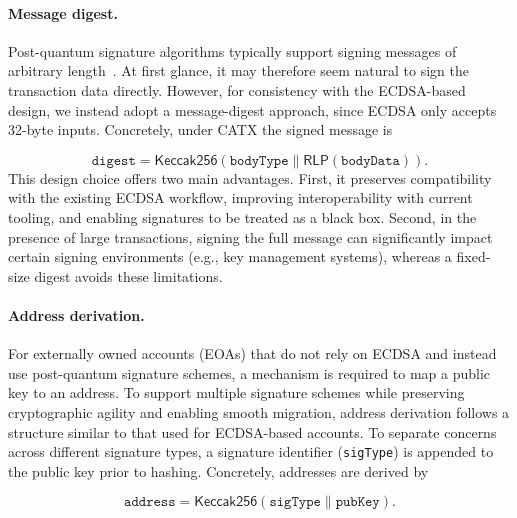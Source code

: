 \paragraph{Message digest.}\label{para:message-digest} Post-quantum signature algorithms typically support signing messages of arbitrary length~\cite{NIST:24MLDSA}.
At first glance, it may therefore seem natural to sign the transaction data directly.
However, for consistency with the ECDSA-based design, we instead adopt a message-digest approach, since ECDSA only accepts 32-byte inputs.
Concretely, under CATX the signed message is

\begin{equation*}
\texttt{digest} = \mathsf{Keccak256}\left(\texttt{bodyType} \parallel \mathsf{RLP}(\texttt{bodyData})\right).
\end{equation*}
This design choice offers two main advantages.
First, it preserves compatibility with the existing ECDSA workflow, improving interoperability with current tooling, and enabling signatures to be treated as a black box.
Second, in the presence of large transactions, signing the full message can significantly impact certain signing environments (e.g., key management systems), whereas a fixed-size digest avoids these limitations.


\paragraph{Address derivation.}\label{para:address-derivation} For externally owned accounts (EOAs) that do not rely on ECDSA and instead use post-quantum signature schemes, a mechanism is required to map a public key to an address.
To support multiple signature schemes while preserving cryptographic agility and enabling smooth migration, address derivation follows a structure similar to that used for ECDSA-based accounts. 
To separate concerns across different signature types, a signature identifier (\texttt{sigType}) is appended to the public key prior to hashing. Concretely, addresses are derived by

\begin{equation*}
\texttt{address} = \mathsf{Keccak256}\left(\texttt{sigType} \parallel \texttt{pubKey}\right).
\end{equation*}


